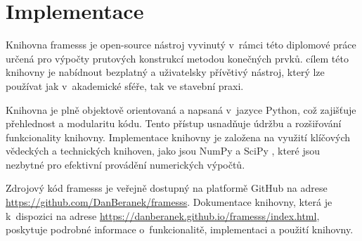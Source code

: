 \section{Implementace}

Knihovna framesss je open-source nástroj vyvinutý v~rámci této diplomové práce určená pro výpočty prutových konstrukcí metodou konečných prvků. cílem této knihovny je nabídnout bezplatný a uživatelsky přívětivý nástroj, který lze používat jak v~akademické sféře, tak ve stavební praxi. 

Knihovna je plně objektově orientovaná a napsaná v~jazyce Python, což zajišťuje přehlednost a modularitu kódu. Tento přístup usnadňuje údržbu a rozšiřování funkcionality knihovny. Implementace knihovny je založena na využití klíčových vědeckých a technických knihoven, jako jsou NumPy \cite{numpy} a SciPy \cite{scipy}, které jsou nezbytné pro efektivní provádění numerických výpočtů.

Zdrojový kód framesss je veřejně dostupný na platformě GitHub na adrese \url{https://github.com/DanBeranek/framesss}. Dokumentace knihovny, která je k~dispozici na adrese \url{https://danberanek.github.io/framesss/index.html}, poskytuje podrobné informace o~funkcionalitě, implementaci a použití knihovny.

\renewcommand*{\arraystretch}{0.8}







